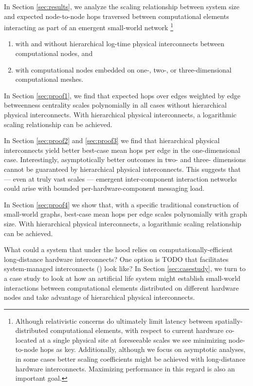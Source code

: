 In Section \ref{sec:results}, we analyze the scaling relationship between system size and expected node-to-node hops traversed between computational elements interacting as part of an emergent small-world network
\footnote{
Although relativistic concerns do ultimately limit latency between spatially-distributed computational elements, with respect to current hardware co-located at a single physical site at foreseeable scales we see minimizing node-to-node hops as key.
Additionally, although we focus on asymptotic analyses, in some cases better scaling coefficients might be achieved with long-distance hardware interconnects.
Maximizing performance in this regard is also an important goal.
}
\begin{enumerate}
\item with and without hierarchical log-time physical interconnects between computational nodes, and
\item with computational nodes embedded on one-, two-, or three-dimensional computational meshes.
\end{enumerate}

In Section \ref{sec:proof1}, we find that expected hops over edges weighted by edge betweenness centrality scales polynomially in all cases without hierarchical physical interconnects.
With hierarchical physical interconnects, a logarithmic scaling relationship can be achieved.

In Section \ref{sec:proof2} and \ref{sec:proof3} we find that hierarchical physical interconnects yield better best-case mean hops per edge in the one-dimensional case.
Interestingly, asymptotically better outcomes in two- and three- dimensions cannot be guaranteed by hierarchical physical interconnects.
This suggests that --- even at truly vast scales --- emergent inter-component interaction networks could arise with bounded per-hardware-component messaging load.

In Section \ref{sec:proof4} we show that, with a specific traditional construction of small-world graphs, best-case mean hops per edge scales polynomially with graph size.
With hierarchical physical interconnects, a logarithmic scaling relationship can be achieved.

What could a system that under the hood relies on computationally-efficient long-distance hardware interconnects?
One option is TODO that facilitates system-managed interconnects () look like?
In Section \ref{sec:casestudy}, we turn to a case study to look at how an artificial life system might establish small-world interactions between computational elements distributed on different hardware nodes and take advantage of hierarchical physical interconnects.

